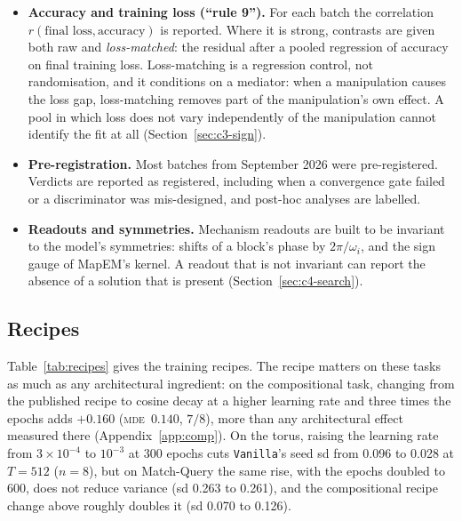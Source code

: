 \documentclass[10pt]{article}
\newcommand{\mde}{\textsc{mde}}
\newcommand{\arm}[1]{\texttt{#1}}
\begin{document}
\begin{itemize}
0--7, $+0.113$ fresh) and the per-pair total ($+0.280$ at $n=8$, $+0.215$ pooled at $n=48$).
\item \textbf{Accuracy and training loss (``rule 9'').} For each batch the correlation
$r(\text{final loss},\text{accuracy})$ is reported. Where it is strong, contrasts are given both raw
and \emph{loss-matched}: the residual after a pooled regression of accuracy on final training loss.
Loss-matching is a regression control, not randomisation, and it conditions on a mediator: when a
manipulation causes the loss gap, loss-matching removes part of the manipulation's own effect. A
pool in which loss does not vary independently of the manipulation cannot identify the fit at all
(Section~\ref{sec:c3-sign}).
\item \textbf{Pre-registration.} Most batches from September 2026 were pre-registered. Verdicts are
reported as registered, including when a convergence gate failed or a discriminator was mis-designed,
and post-hoc analyses are labelled.
\item \textbf{Readouts and symmetries.} Mechanism readouts are built to be invariant to the model's
symmetries: shifts of a block's phase by $2\pi/\omega_i$, and the sign gauge of MapEM's kernel. A
readout that is not invariant can report the absence of a solution that is present
(Section~\ref{sec:c4-search}).
\end{itemize}

\subsection{Recipes}
\label{sec:recipes}

Table~\ref{tab:recipes} gives the training recipes. The recipe matters on these tasks as much as any
architectural ingredient: on the compositional task, changing from the published recipe to cosine
decay at a higher learning rate and three times the epochs adds $+0.160$ (\mde\ $0.140$, $7/8$), more
than any architectural effect measured there (Appendix~\ref{app:comp}). %
On the torus, raising the learning rate from $3\times10^{-4}$ to $10^{-3}$ at 300 epochs cuts
\arm{Vanilla}'s seed sd from 0.096 to 0.028 at $T=512$ ($n=8$), but on Match-Query the same rise, with the
epochs doubled to 600, does not reduce variance (sd 0.263 to 0.261), and the compositional recipe change above
roughly doubles it (sd 0.070 to 0.126).
\end{document}
